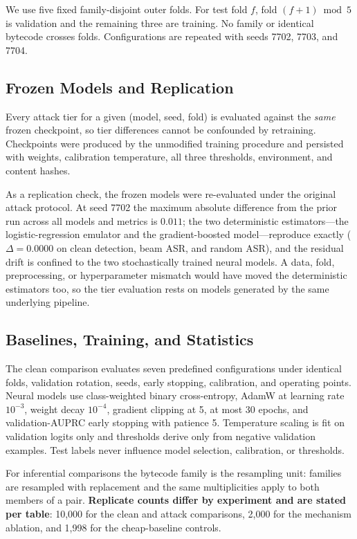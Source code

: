\documentclass[conference]{IEEEtran}
\begin{document}
We use five fixed family-disjoint outer folds. For test fold $f$, fold $(f+1)\bmod 5$ is validation and the remaining three are training. No family or identical bytecode crosses folds. Configurations are repeated with seeds 7702, 7703, and 7704.

\subsection{Frozen Models and Replication}
\label{sec:replication}

Every attack tier for a given (model, seed, fold) is evaluated against the \emph{same} frozen checkpoint, so tier differences cannot be confounded by retraining. Checkpoints were produced by the unmodified training procedure and persisted with weights, calibration temperature, all three thresholds, environment, and content hashes.

As a replication check, the frozen models were re-evaluated under the original attack protocol. At seed 7702 the maximum absolute difference from the prior run across all models and metrics is $0.011$; the two deterministic estimators---the logistic-regression emulator and the gradient-boosted model---reproduce exactly ($\Delta = 0.0000$ on clean detection, beam ASR, and random ASR), and the residual drift is confined to the two stochastically trained neural models. A data, fold, preprocessing, or hyperparameter mismatch would have moved the deterministic estimators too, so the tier evaluation rests on models generated by the same underlying pipeline.

\subsection{Baselines, Training, and Statistics}

The clean comparison evaluates seven predefined configurations under identical folds, validation rotation, seeds, early stopping, calibration, and operating points. Neural models use class-weighted binary cross-entropy, AdamW at learning rate $10^{-3}$, weight decay $10^{-4}$, gradient clipping at 5, at most 30 epochs, and validation-AUPRC early stopping with patience 5. Temperature scaling is fit on validation logits only and thresholds derive only from negative validation examples. Test labels never influence model selection, calibration, or thresholds.

For inferential comparisons the bytecode family is the resampling unit: families are resampled with replacement and the same multiplicities apply to both members of a pair. \textbf{Replicate counts differ by experiment and are stated per table}: 10,000 for the clean and attack comparisons, 2,000 for the mechanism ablation, and 1,998 for the cheap-baseline controls.
\end{document}
